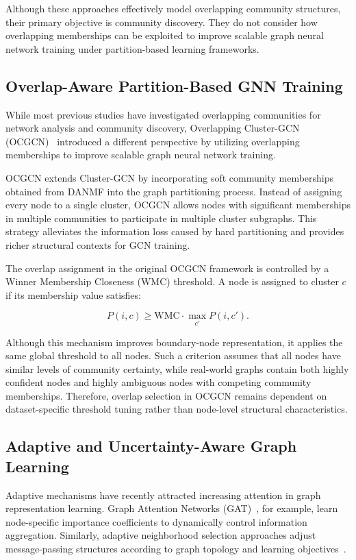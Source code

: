 \documentclass[a4paper,11pt,oneside,onecolumn,preprint]{elsarticle}
\numberwithin{equation}{section}
\begin{document}
Although these approaches effectively model overlapping community structures, their primary objective is community discovery.
They do not consider how overlapping memberships can be exploited to improve scalable graph neural network training under partition-based learning frameworks.

\subsection{Overlap-Aware Partition-Based GNN Training}

While most previous studies have investigated overlapping communities for network analysis and community discovery, Overlapping Cluster-GCN (OCGCN)~\cite{Amintoosi2021} introduced a different perspective by utilizing overlapping memberships to improve scalable graph neural network training.

OCGCN extends Cluster-GCN by incorporating soft community memberships obtained from DANMF into the graph partitioning process.
Instead of assigning every node to a single cluster, OCGCN allows nodes with significant memberships in multiple communities to participate in multiple cluster subgraphs.
This strategy alleviates the information loss caused by hard partitioning and provides richer structural contexts for GCN training.

The overlap assignment in the original OCGCN framework is controlled by a Winner Membership Closeness (WMC) threshold.
A node is assigned to cluster $c$ if its membership value satisfies:

\[
P(i,c) \geq \mathrm{WMC}\cdot \max_{c'}P(i,c').
\]

Although this mechanism improves boundary-node representation, it applies the same global threshold to all nodes.
Such a criterion assumes that all nodes have similar levels of community certainty, while real-world graphs contain both highly confident nodes and highly ambiguous nodes with competing community memberships.
Therefore, overlap selection in OCGCN remains dependent on dataset-specific threshold tuning rather than node-level structural characteristics.

\subsection{Adaptive and Uncertainty-Aware Graph Learning}

Adaptive mechanisms have recently attracted increasing attention in graph representation learning.
Graph Attention Networks (GAT)~\cite{vel2018graph}, for example, learn node-specific importance coefficients to dynamically control information aggregation.
Similarly, adaptive neighborhood selection approaches adjust message-passing structures according to graph topology and learning objectives~\cite{Peng2021, Guang2024}.
\end{document}
